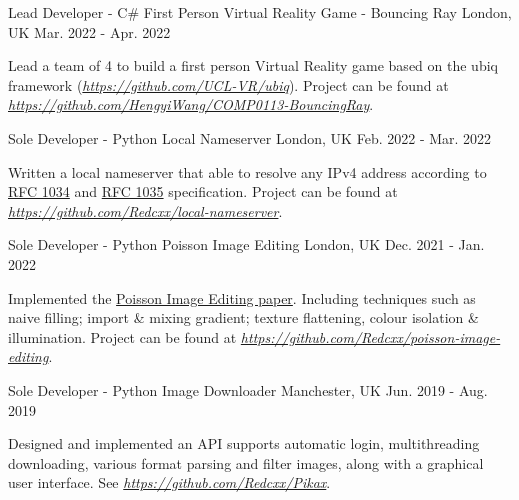 \begin{cventries}
  \cventry
    {Lead Developer - C\#} %
    {First Person Virtual Reality Game - Bouncing Ray} %
    {London, UK} %
    {Mar. 2022 - Apr. 2022} %
    {
      \begin{cvitems} %
        \item {Lead a team of 4 to build a first person Virtual Reality game based on the ubiq framework (\href{https://github.com/UCL-VR/ubiq}{\textit{https://github.com/UCL-VR/ubiq}}). Project can be found at \href{https://github.com/HengyiWang/COMP0113-BouncingRay}{\textit{https://github.com/HengyiWang/COMP0113-BouncingRay}}.}
      \end{cvitems}
    }
  
  \cventry
    {Sole Developer - Python} %
    {Local Nameserver} %
    {London, UK} %
    {Feb. 2022 - Mar. 2022} %
    {
      \begin{cvitems} %
        \item {Written a local nameserver that able to resolve any IPv4 address according to \href{https://datatracker.ietf.org/doc/html/rfc1034}{RFC 1034} and \href{https://datatracker.ietf.org/doc/html/rfc1035}{RFC 1035} specification. Project can be found at \href{https://github.com/Redcxx/local-nameserver}{\textit{https://github.com/Redcxx/local-nameserver}}.}
      \end{cvitems}
    }
    
  \cventry
    {Sole Developer - Python} %
    {Poisson Image Editing} %
    {London, UK} %
    {Dec. 2021 - Jan. 2022} %
    {
      \begin{cvitems} %
        \item {Implemented the \href{https://www.cs.jhu.edu/~misha/Fall07/Papers/Perez03.pdf}{Poisson Image Editing paper}. Including techniques such as naive filling; import \& mixing gradient; texture flattening, colour isolation \& illumination.  Project can be found at \href{https://github.com/Redcxx/poisson-image-editing}{\textit{https://github.com/Redcxx/poisson-image-editing}}.}
      \end{cvitems}
    }

  \cventry
    {Sole Developer - Python} %
    {Image Downloader} %
    {Manchester, UK} %
    {Jun. 2019 - Aug. 2019} %
    {
      \begin{cvitems} %
        \item {Designed and implemented an API supports automatic login, multithreading downloading, various format parsing and filter images, along with a graphical user interface. See \href{https://github.com/Redcxx/Pikax}{\textit{https://github.com/Redcxx/Pikax}}.}
      \end{cvitems}
    }
    

\end{cventries}
